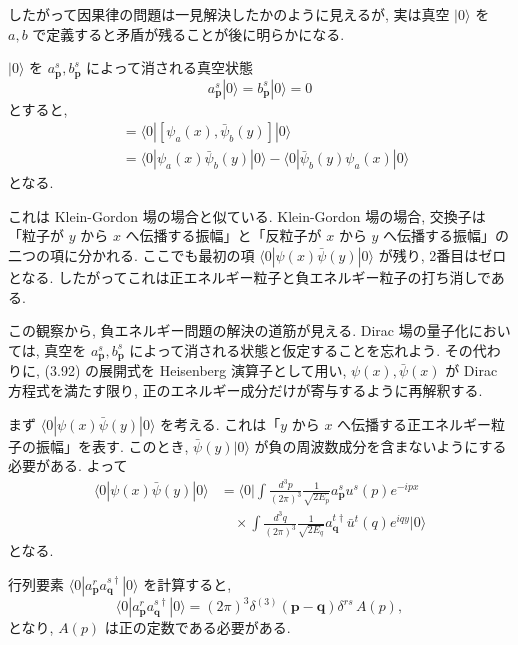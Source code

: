 \documentclass[a4paper,12pt]{article}
\begin{document}
したがって因果律の問題は一見解決したかのように見えるが, 実は真空 $|0\rangle$ を $a, b$ で定義すると矛盾が残ることが後に明らかになる.


$|0\rangle$ を $a^s_{\mathbf{p}}, b^s_{\mathbf{p}}$ によって消される真空状態
\begin{equation}
a^s_{\mathbf{p}}|0\rangle = b^s_{\mathbf{p}}|0\rangle = 0
\end{equation}
とすると,
\begin{align}
[\psi_a(x), \bar{\psi}_b(y)] 
&= \langle 0| [\psi_a(x), \bar{\psi}_b(y)] |0\rangle \\
&= \langle 0| \psi_a(x)\bar{\psi}_b(y)|0\rangle - \langle 0| \bar{\psi}_b(y)\psi_a(x)|0\rangle
\end{align}
となる.  

これは Klein-Gordon 場の場合と似ている. Klein-Gordon 場の場合, 交換子は
「粒子が $y$ から $x$ へ伝播する振幅」と「反粒子が $x$ から $y$ へ伝播する振幅」の二つの項に分かれる.  
ここでも最初の項 $\langle 0|\psi(x)\bar{\psi}(y)|0\rangle$ が残り, 2番目はゼロとなる. したがってこれは正エネルギー粒子と負エネルギー粒子の打ち消しである.

この観察から, 負エネルギー問題の解決の道筋が見える.  
Dirac 場の量子化においては, 真空を $a^s_{\mathbf{p}}, b^s_{\mathbf{p}}$ によって消される状態と仮定することを忘れよう.  
その代わりに, (3.92) の展開式を Heisenberg 演算子として用い, $\psi(x), \bar{\psi}(x)$ が Dirac 方程式を満たす限り, 正のエネルギー成分だけが寄与するように再解釈する.

まず $\langle 0|\psi(x)\bar{\psi}(y)|0\rangle$ を考える.  
これは「$y$ から $x$ へ伝播する正エネルギー粒子の振幅」を表す.  
このとき, $\bar{\psi}(y)|0\rangle$ が負の周波数成分を含まないようにする必要がある. よって
\begin{align}
\langle 0|\psi(x)\bar{\psi}(y)|0\rangle
&= \langle 0| \int \frac{d^3p}{(2\pi)^3}\frac{1}{\sqrt{2E_p}} a^s_{\mathbf{p}} u^s(p)e^{-ipx} \\
&\quad \times \int \frac{d^3q}{(2\pi)^3}\frac{1}{\sqrt{2E_q}} a^{t\dagger}_{\mathbf{q}} \bar{u}^t(q)e^{iqy} |0\rangle
\tag{3.93}
\end{align}
となる.

行列要素 $\langle 0|a^r_{\mathbf{p}} a^{s\dagger}_{\mathbf{q}}|0\rangle$ を計算すると,
\begin{equation}
\langle 0| a^r_{\mathbf{p}} a^{s\dagger}_{\mathbf{q}} |0\rangle = (2\pi)^3 \delta^{(3)}(\mathbf{p}-\mathbf{q}) \delta^{rs}\, A(p),
\end{equation}
となり, $A(p)$ は正の定数である必要がある.
\end{document}
